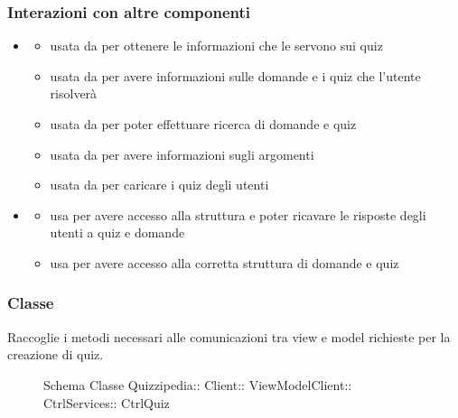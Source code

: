 \subsubsection{Interazioni con altre componenti}
\begin{itemize}
\item {}
\begin{itemize}
\item usata da  per ottenere le informazioni che le servono sui quiz
\item usata da  per avere informazioni sulle domande e i quiz che l'utente risolverà
\item usata da  per poter effettuare ricerca di domande e quiz
\item usata da  per avere informazioni sugli argomenti
\item usata da  per caricare i quiz degli utenti
\end{itemize}
\item {}
\begin{itemize}
\item usa  per avere accesso alla struttura e poter ricavare le risposte degli utenti a quiz e domande
\item usa  per avere accesso alla corretta struttura di domande e quiz
\end{itemize}
\end{itemize}
\subsubsection{Classe }
Raccoglie i metodi necessari alle comunicazioni tra view e model richieste per la creazione di quiz.
\begin{figure}[H]
\centering
\noindent{}
\caption[Schema Classe CtrlQuiz]{Schema Classe Quizzipedia:: Client:: ViewModelClient:: CtrlServices:: CtrlQuiz}
\end{figure}
